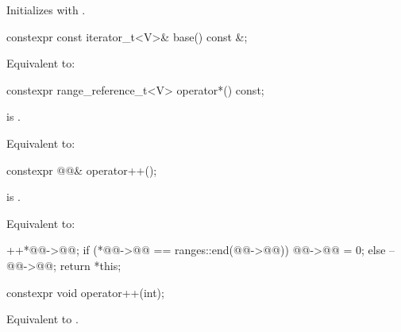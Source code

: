 \begin{itemdescr}
\pnum
\effects
Initializes  with .
\end{itemdescr}

%
\begin{itemdecl}
constexpr const iterator_t<V>& base() const &;
\end{itemdecl}

\begin{itemdescr}
\pnum
\effects
Equivalent to: 
\end{itemdescr}

%
\begin{itemdecl}
constexpr range_reference_t<V> operator*() const;
\end{itemdecl}

\begin{itemdescr}
\pnum
\expects
{} is .

\pnum
\effects
Equivalent to: 
\end{itemdescr}

%
\begin{itemdecl}
constexpr @@& operator++();
\end{itemdecl}

\begin{itemdescr}
\pnum
\expects
{} is .

\pnum
\effects
Equivalent to:
\begin{codeblock}
++*@@->@@;
if (*@@->@@ == ranges::end(@@->@@))
  @@->@@ = 0;
else
  --@@->@@;
return *this;
\end{codeblock}
\end{itemdescr}

%
\begin{itemdecl}
constexpr void operator++(int);
\end{itemdecl}

\begin{itemdescr}
\pnum
\effects
Equivalent to .
\end{itemdescr}

